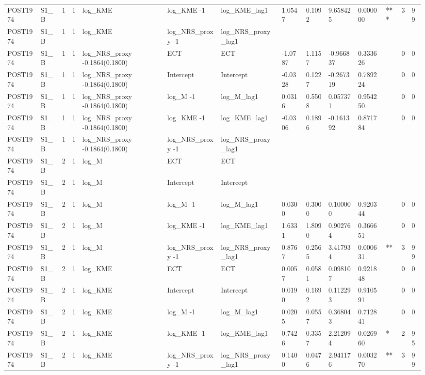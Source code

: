 \begin{tabular}{llllllllllllll}
POST1974 & S1\_B & 1 & 1 & log\_KME & log\_KME -1 & log\_KME\_lag1 & 1.0547 & 0.1092 & 9.658425 & 0.000000 & *** & 3 & 99 \\
POST1974 & S1\_B & 1 & 1 & log\_KME & log\_NRS\_proxy -1 & log\_NRS\_proxy\_lag1 &  &  &  &  &  &  &  \\
POST1974 & S1\_B & 1 & 1 & log\_NRS\_proxy -0.1864(0.1800) & ECT & ECT & -1.0787 & 1.1157 & -0.966837 & 0.333626 &  & 0 & 0 \\
POST1974 & S1\_B & 1 & 1 & log\_NRS\_proxy -0.1864(0.1800) & Intercept & Intercept & -0.0328 & 0.1227 & -0.267319 & 0.789224 &  & 0 & 0 \\
POST1974 & S1\_B & 1 & 1 & log\_NRS\_proxy -0.1864(0.1800) & log\_M -1 & log\_M\_lag1 & 0.0316 & 0.5508 & 0.057371 & 0.954250 &  & 0 & 0 \\
POST1974 & S1\_B & 1 & 1 & log\_NRS\_proxy -0.1864(0.1800) & log\_KME -1 & log\_KME\_lag1 & -0.0306 & 0.1896 & -0.161392 & 0.871784 &  & 0 & 0 \\
POST1974 & S1\_B & 1 & 1 & log\_NRS\_proxy -0.1864(0.1800) & log\_NRS\_proxy -1 & log\_NRS\_proxy\_lag1 &  &  &  &  &  &  &  \\
POST1974 & S1\_B & 2 & 1 & log\_M & ECT & ECT &  &  &  &  &  &  &  \\
POST1974 & S1\_B & 2 & 1 & log\_M & Intercept & Intercept &  &  &  &  &  &  &  \\
POST1974 & S1\_B & 2 & 1 & log\_M & log\_M -1 & log\_M\_lag1 & 0.0300 & 0.3000 & 0.100000 & 0.920344 &  & 0 & 0 \\
POST1974 & S1\_B & 2 & 1 & log\_M & log\_KME -1 & log\_KME\_lag1 & 1.6331 & 1.8090 & 0.902764 & 0.366651 &  & 0 & 0 \\
POST1974 & S1\_B & 2 & 1 & log\_M & log\_NRS\_proxy -1 & log\_NRS\_proxy\_lag1 & 0.8767 & 0.2565 & 3.417934 & 0.000631 & ** & 3 & 99 \\
POST1974 & S1\_B & 2 & 1 & log\_KME & ECT & ECT & 0.0057 & 0.0581 & 0.098107 & 0.921848 &  & 0 & 0 \\
POST1974 & S1\_B & 2 & 1 & log\_KME & Intercept & Intercept & 0.0190 & 0.1692 & 0.112293 & 0.910591 &  & 0 & 0 \\
POST1974 & S1\_B & 2 & 1 & log\_KME & log\_M -1 & log\_M\_lag1 & 0.0205 & 0.0557 & 0.368043 & 0.712841 &  & 0 & 0 \\
POST1974 & S1\_B & 2 & 1 & log\_KME & log\_KME -1 & log\_KME\_lag1 & 0.7426 & 0.3357 & 2.212094 & 0.026960 & * & 2 & 95 \\
POST1974 & S1\_B & 2 & 1 & log\_KME & log\_NRS\_proxy -1 & log\_NRS\_proxy\_lag1 & 0.1400 & 0.0476 & 2.941176 & 0.003270 & ** & 3 & 99 \\

\end{tabular}
